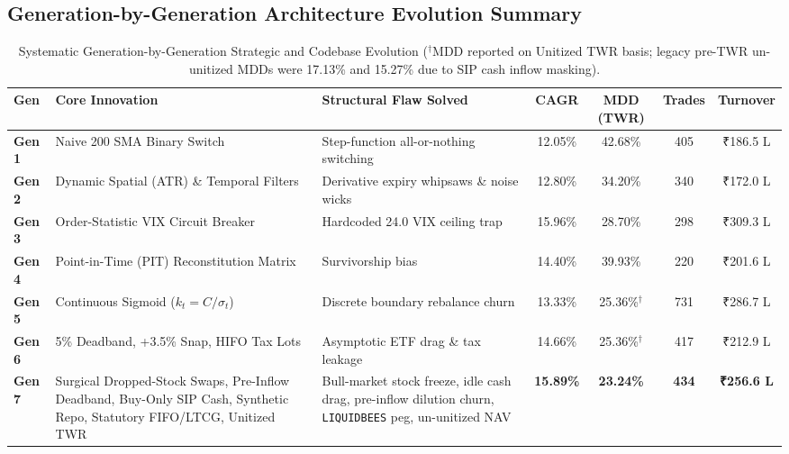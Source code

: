 \documentclass[11pt,a4paper]{article}
\begin{document}
\subsection{Generation-by-Generation Architecture Evolution Summary}
\begin{table}[H]
\centering
\scriptsize
\begin{tabularx}{\textwidth}{lp{3.2cm}p{3.8cm}cccc}
\toprule
\textbf{Gen} & \textbf{Core Innovation} & \textbf{Structural Flaw Solved} & \textbf{CAGR} & \textbf{MDD (TWR)} & \textbf{Trades} & \textbf{Turnover} \\
\midrule
\textbf{Gen 1} & Naive 200 SMA Binary Switch & Step-function all-or-nothing switching & 12.05\% & 42.68\% & 405 & ₹186.5 L \\
\addlinespace
\textbf{Gen 2} & Dynamic Spatial (ATR) \& Temporal Filters & Derivative expiry whipsaws \& noise wicks & 12.80\% & 34.20\% & 340 & ₹172.0 L \\
\addlinespace
\textbf{Gen 3} & Order-Statistic VIX Circuit Breaker & Hardcoded 24.0 VIX ceiling trap & 15.96\% & 28.70\% & 298 & ₹309.3 L \\
\addlinespace
\textbf{Gen 4} & Point-in-Time (PIT) Reconstitution Matrix & Survivorship bias & 14.40\% & 39.93\% & 220 & ₹201.6 L \\
\addlinespace
\textbf{Gen 5} & Continuous Sigmoid ($k_t = C/\sigma_t$) & Discrete boundary rebalance churn & 13.33\% & 25.36\%$^\dagger$ & 731 & ₹286.7 L \\
\addlinespace
\textbf{Gen 6} & 5\% Deadband, +3.5\% Snap, HIFO Tax Lots & Asymptotic ETF drag \& tax leakage & 14.66\% & 25.36\%$^\dagger$ & 417 & ₹212.9 L \\
\addlinespace
\textbf{Gen 7} & Surgical Dropped-Stock Swaps, Pre-Inflow Deadband, Buy-Only SIP Cash, Synthetic Repo, Statutory FIFO/LTCG, Unitized TWR & Bull-market stock freeze, idle cash drag, pre-inflow dilution churn, \texttt{LIQUIDBEES} peg, un-unitized NAV & \textbf{15.89\%} & \textbf{23.24\%} & \textbf{434} & \textbf{₹256.6 L} \\
\bottomrule
\end{tabularx}
\caption{Systematic Generation-by-Generation Strategic and Codebase Evolution ($^\dagger$MDD reported on Unitized TWR basis; legacy pre-TWR un-unitized MDDs were 17.13\% and 15.27\% due to SIP cash inflow masking).}
\end{table}
\end{document}
